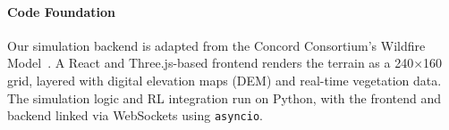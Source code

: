\documentclass[conference]{IEEEtran}
\begin{document}


\paragraph{Code Foundation}
Our simulation backend is adapted from the Concord Consortium's Wildfire Model~\cite{concord_consortium}. A React and Three.js-based frontend renders the terrain as a 240\(\times\)160 grid, layered with digital elevation maps (DEM) and real-time vegetation data. The simulation logic and RL integration run on Python, with the frontend and backend linked via WebSockets using \texttt{asyncio}.
\end{document}

